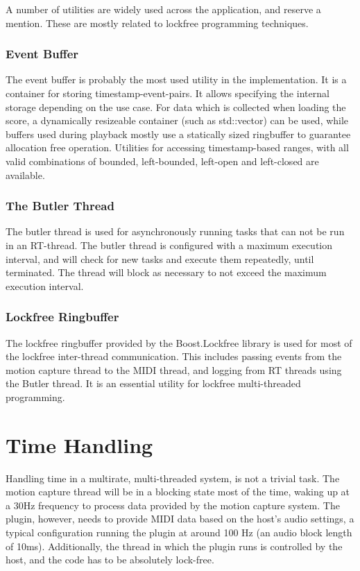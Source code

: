 A number of utilities are widely used across the application,
and reserve a mention.
These are mostly related to lockfree programming techniques.

\subsubsection*{Event Buffer}

The event buffer is probably the most used utility in the implementation.
It is a container for storing timestamp-event-pairs.
It allows specifying the internal storage depending on the use case.
For data which is collected when loading the score,
a dynamically resizeable container (such as std::vector) can be used,
while buffers used during playback mostly use a statically sized ringbuffer
to guarantee allocation free operation.
Utilities for accessing timestamp-based ranges,
with all valid combinations of
bounded, left-bounded, left-open and left-closed are available.

\subsubsection*{The Butler Thread}

The butler thread is used for asynchronously running
tasks that can not be run in an RT-thread.
The butler thread is configured with a maximum execution interval,
and will check for new tasks and execute them repeatedly,
until terminated.
The thread will block as necessary to not exceed the
maximum execution interval.

\subsubsection*{Lockfree Ringbuffer}

The lockfree ringbuffer provided by the Boost.Lockfree library \cite{required?}
is used for most of the lockfree inter-thread communication.
This includes passing events from the motion capture thread
to the MIDI thread, and logging from RT threads using the Butler thread.
It is an essential utility for lockfree multi-threaded programming.

\section{Time Handling}

Handling time in a multirate, multi-threaded system,
is not a trivial task.
The motion capture thread will be in
a blocking state most of the time,
waking up at a 30Hz frequency to process data
provided by the motion capture system.
The plugin, however, needs to provide MIDI data
based on the host's audio settings,
a typical configuration running the
plugin at around 100 Hz (an audio block length of 10ms).
Additionally, the thread in which the plugin runs
is controlled by the host,
and the code has to be absolutely lock-free.

